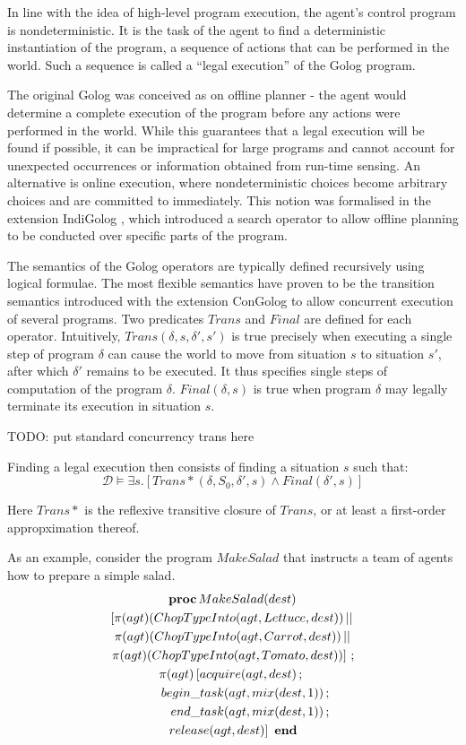 \documentclass[letterpaper]{article}
\begin{document}
In line with the idea of high-level program execution, the agent's
control program is nondeterministic. It is the task of the agent to
find a deterministic instantiation of the program, a sequence of actions
that can be performed in the world. Such a sequence is called a ``legal
execution'' of the Golog program.

The original Golog was conceived as on offline planner - the agent
would determine a complete execution of the program before any actions
were performed in the world. While this guarantees that a legal execution
will be found if possible, it can be impractical for large programs
and cannot account for unexpected occurrences or information obtained
from run-time sensing. An alternative is online execution, where nondeterministic
choices become arbitrary choices and are committed to immediately.
This notion was formalised in the extension IndiGolog \cite{giacomo99indigolog},
which introduced a search operator to allow offline planning to be
conducted over specific parts of the program.

The semantics of the Golog operators are typically defined recursively
using logical formulae. The most flexible semantics have proven to
be the transition semantics introduced with the extension ConGolog
\cite{giacomo00congolog} to allow concurrent execution of several
programs. Two predicates $Trans$ and $Final$ are defined for each
operator. Intuitively, $Trans(\delta,s,\delta',s')$ is true precisely
when executing a single step of program $\delta$ can cause the world
to move from situation $s$ to situation $s'$, after which $\delta'$
remains to be executed. It thus specifies single steps of computation
of the program $\delta$. $Final(\delta,s)$ is true when program
$\delta$ may legally terminate its execution in situation $s$.

TODO: put standard concurrency trans here

Finding
a legal execution then consists of finding a situation $s$ such that:
\begin{equation}
\mathcal{D}\models\exists s.\left[Trans*(\delta,S_{0},\delta',s)\wedge Final(\delta',s)\right]
\end{equation}

Here $Trans*$ is the reflexive transitive closure of $Trans$, or at least a
first-order appropximation thereof.

As an example, consider the program $MakeSalad$ that instructs a team of
agents how to prepare a simple salad.
\begin{multline}
\label{eqn:MakeSalad}
\mathbf{proc}\,MakeSalad(dest)\\
\left[\pi(agt)(ChopTypeInto(agt,Lettuce,dest))\,||\right.\\
\pi(agt)(ChopTypeInto(agt,Carrot,dest))\,||\\
\left.\pi(agt)(ChopTypeInto(agt,Tomato,dest))\right]\,;\\
\pi(agt)\left[acquire(agt,dest)\,;\right.\\
 \shoveright{begin\_task(agt,mix(dest,1))\,;\quad}\\
 \shoveright{end\_task(agt,mix(dest,1))\,;\quad}\\
 \left.release(agt,dest)\right]\,\,\mathbf{end}
\end{multline}
\end{document}

